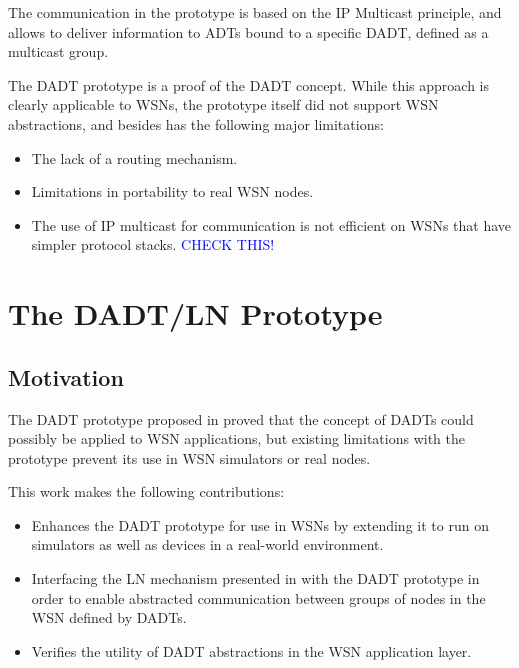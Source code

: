 The communication in the prototype is based on the IP Multicast principle, and
allows to deliver information to ADTs bound to a specific DADT, defined as
a multicast group.

The DADT prototype is a proof of the DADT concept. While this
approach is clearly applicable to WSNs, the prototype itself did not support WSN
abstractions, and besides has the following major limitations:

\begin{itemize}
  \item The lack of a routing mechanism.
  \item Limitations in portability to real WSN nodes.
  \item The use of IP multicast for communication is not efficient on WSNs that have simpler protocol stacks. \textcolor{blue}{CHECK THIS!}
\end{itemize}

\section{The DADT/LN Prototype}

\subsection{Motivation}

The DADT prototype proposed in \cite{migliavacca_DADT:2006} proved that the
concept of DADTs could possibly be applied to WSN
applications, but existing limitations with the prototype prevent its use in WSN simulators or real nodes.

This work makes the following contributions:

\begin{itemize}
  \item Enhances the DADT prototype for use in WSNs by extending it to run
  on simulators as well as devices in a real-world environment.
  \item Interfacing the LN mechanism presented in \cite{mottola_LNAbstraction} with the DADT prototype in order
  to enable abstracted communication between groups of nodes in the WSN defined
  by DADTs.
  \item  Verifies the utility of DADT abstractions in the WSN
  application layer.
\end{itemize}

